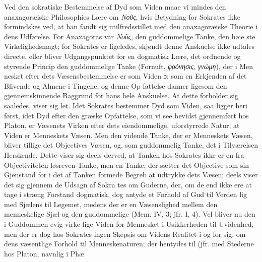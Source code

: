 \documentclass[12pt,a4paper]{book}
\newcommand{\gk}[1]{\textit{#1}}
\begin{document}
Ved den sokratiske Bestemmelse af Dyd som Viden maae
vi mindes den anaxagoræiske Philosophies Lære om \gk{Νοῦς}, hvis
Betydning for Sokrates ikke formindskes ved, at han fandt sig
utilfredsstillet med den anaxagoræiske Theorie i dens Udførelse.
For Anaxagoras var \gk{Νοῦς}, den guddommelige Tanke, den høie\-%
ste Virkelighedsmagt; for Sokrates er ligeledes, skjøndt denne
Anskuelse ikke udtales directe, eller bliver Udgangspunktet for
en dogmatisk Lære, det ordnende og styrende Princip den
guddommelige Tanke (Fornuft, \gk{φρόνησις}, \gk{γνώμη}), der i Men\-%
nesket efter dets Væsensbestemmelse er som Viden ɔ: som en
Erkjenden af det Blivende og Almene i Tingene, og denne Op\-%
fattelse danner ligesom den gjennemskinnende Baggrund for
hans hele Anskuelse. At dette forholder sig saaledes, viser
sig let. Idet Sokrates bestemmer Dyd som Viden, saa ligger
heri først, idet Dyd efter den græske Opfattelse, som vi see
bevidst gjennemført hos Platon, er Væsenets Virken efter dets
eiendommelige, uforstyrrede Natur, at Viden er Menneskets
Væsen. Men den vidende Tanke, der er Menneskets Væsen,
bliver tillige det Objectives Væsen, og, som guddommelig Tanke,
det i Tilværelsen Herskende. Dette viser sig deels derved, at
Tanken hos Sokrates ikke er en fra Objectiviteten løsreven
Tanke, men en Tanke, der sætter det Objective som sin
Gjenstand for i det af Tanken formede Begreb at udtrykke
dets Væsen; deels viser det sig gjennem de Udsagn af Sokra\-%
tes om Guderne, der, om de end ikke ere at tage i stræng
Forstand dogmatisk, dog antyde et Forhold af Gud til Verden
lig med Sjælens til Legemet, medens der er en Væsenslighed
mellem den menneskelige Sjæl og den guddommelige (Mem.
IV, 3; jfr. I, 4). Vel bliver nu den i Guddommen evig virke\-%
lige Viden for Mennesket i Usikkerheden til Uvidenhed, men
der er dog hos Sokrates ingen Skepsis om Videns Realitet i
og for sig, om dens væsentlige Forhold til Menneskenaturen;
der hentydes til (jfr. med Stederne hos Platon, navnlig i Phæ\-%
\end{document}
